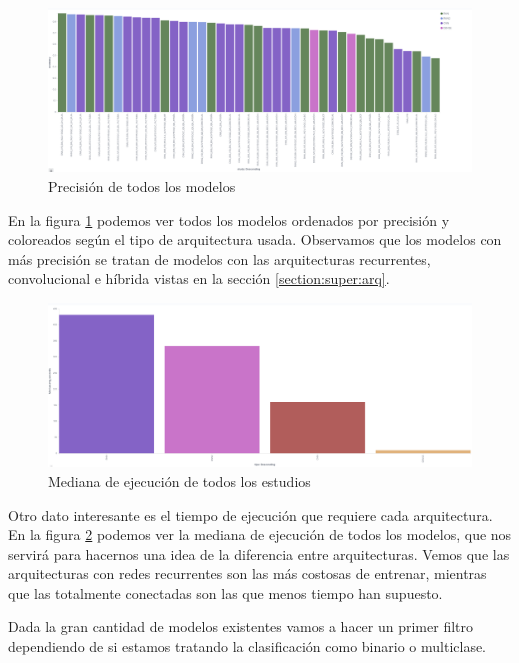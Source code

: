 \begin{figure}[!ht]
	\centering
	\includegraphics[width=1\textwidth]{images/super/resumen_todos}
	\caption{Precisión de todos los modelos}
	\label{fig:resumen_todos}
\end{figure}

En la figura \ref{fig:resumen_todos} podemos ver todos los modelos ordenados por precisión y coloreados según el tipo de arquitectura usada. Observamos que los modelos con más precisión se tratan de modelos con las arquitecturas recurrentes, convolucional e híbrida vistas en la sección \ref{section:super:arq}.



\begin{figure}[!ht]
	\centering
	\includegraphics[width=1\textwidth]{images/super/resumen_tiempo}
	\caption{Mediana de ejecución de todos los estudios}
	\label{fig:resumen_tiempo}
\end{figure}

Otro dato interesante es el tiempo de ejecución que requiere cada arquitectura. En la figura \ref{fig:resumen_tiempo} podemos ver la mediana de ejecución de todos los modelos, que nos servirá para hacernos una idea de la diferencia entre arquitecturas. Vemos que las arquitecturas con redes recurrentes son las más costosas de entrenar, mientras que las totalmente conectadas son las que menos tiempo han supuesto.

\FloatBarrier


Dada la gran cantidad de modelos existentes vamos a hacer un primer filtro dependiendo de si estamos tratando la clasificación como binario o multiclase.

